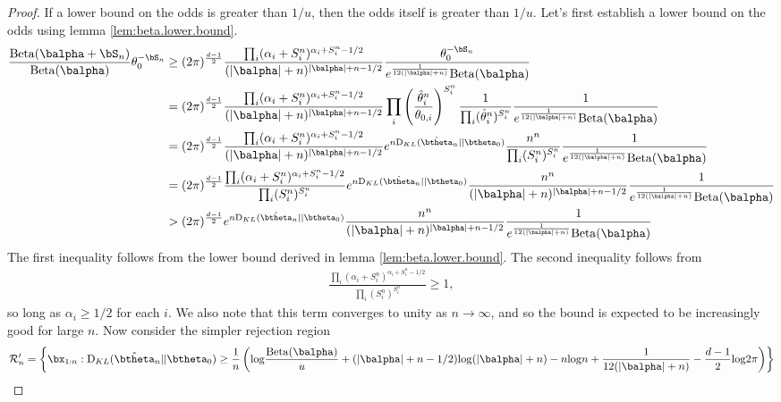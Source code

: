\documentclass[11pt]{article}
\def\log{{\rm log}}
\newcommand{\Beta}{\mathrm{Beta}}
\newcommand{\KL}{\mathrm{D}_{KL}}
\begin{document}
\begin{proof}
If a lower bound on the odds is greater than $1/u$, then the odds itself is greater than $1/u$. Let's first
establish a lower bound on the odds using lemma \ref{lem:beta.lower.bound}.
\begin{align*}
    \frac{\Beta(\balpha + \bS_n)}
  {\Beta(\balpha)} \theta_0^{-\bS_n}
  &\geq
  (2\pi)^{\frac{d-1}{2}}
    \frac{ \prod_i (\alpha_i+S_i^n)^{\alpha_i + S_i^n-1/2}}
    {(|\balpha|+n)^{|\balpha| + n - 1/2}}
    \frac{ \theta_0^{-\bS_n}}{e^{\frac{1}{12(|\balpha|+n)}}\Beta(\balpha)}\\
  &=
  (2\pi)^{\frac{d-1}{2}}
    \frac{ \prod_i (\alpha_i+S_i^n)^{\alpha_i + S_i^n-1/2}}
    {(|\balpha|+n)^{|\balpha| + n - 1/2}}
    \prod_i \left( \frac{\hat{\theta}^n_i}{\theta_{0,i}} \right)^{S^n_i}
    \frac{1}{\prod_i (\hat{\theta}^n_i)^{S^{n}_{i}}}
    \frac{ 1}{e^{\frac{1}{12(|\balpha|+n)}}\Beta(\balpha)}\\
  &=
  (2\pi)^{\frac{d-1}{2}}
    \frac{ \prod_i (\alpha_i+S_i^n)^{\alpha_i + S_i^n-1/2}}
    {(|\balpha|+n)^{|\balpha| + n - 1/2}}
    e^{n \KL(\hat\btheta_n|| \btheta_0)}
    \frac{n^{n}}{\prod_i (S^n_i)^{S^{n}_{i}}}
    \frac{ 1}{e^{\frac{1}{12(|\balpha|+n)}}\Beta(\balpha)}\\
  &=
  (2\pi)^{\frac{d-1}{2}}
    \frac{ \prod_i (\alpha_i+S_i^n)^{\alpha_i + S_i^n-1/2}}
    {\prod_i (S^n_i)^{S^{n}_{i}}}
    e^{n \KL(\hat\btheta_n|| \btheta_0)}
    \frac{n^{n}}{(|\balpha|+n)^{|\balpha| + n - 1/2}}
    \frac{ 1}{e^{\frac{1}{12(|\balpha|+n)}}\Beta(\balpha)}\\
  &>
  (2\pi)^{\frac{d-1}{2}}
    e^{n \KL(\hat\btheta_n|| \btheta_0)}
    \frac{n^{n}}{(|\balpha|+n)^{|\balpha| + n - 1/2}}
    \frac{ 1}{e^{\frac{1}{12(|\balpha|+n)}}\Beta(\balpha)}\\
\end{align*}
The first inequality follows from the lower bound derived in lemma \ref{lem:beta.lower.bound}.
The second inequality follows from
\begin{align*}
  \frac{ \prod_i (\alpha_i+S_i^n)^{\alpha_i + S_i^n-1/2}}
  {\prod_i (S^n_i)^{S^{n}_{i}}} \geq 1,
\end{align*}
so long as $\alpha_i \geq 1/2$ for each $i$. We also note that this term converges to unity as $n\rightarrow \infty$, and
so the bound is expected to be increasingly good for large $n$.
Now consider the simpler rejection region
\begin{align*}
  \mathcal{R}_n' &= \left\{ \bx_{1:n} : 
  \KL(\hat\btheta_n|| \btheta_0) \geq \frac{1}{n}\left( \log \frac{\Beta(\balpha)}{u} +(|\balpha|+n-1/2)\log(|\balpha|+n)-n\log n + \frac{1}{12(|\balpha|+n)} - \frac{d-1}{2}\log 2\pi\right)\right\}\\

\end{align*}
\end{proof}
\end{document}

